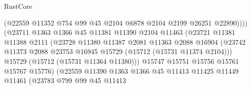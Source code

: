 \begin{lexlean}{RustCore}
\begin{coremodule}
                                      (@22559
                                        @11352
                                        @754
                                        @99
                                        @45
                                        @2104
                                        @6878
                                        @2104
                                        @2199
                                        @26251
                                        @22890))))
                                (@23711
                                  @1363
                                  @1366
                                  @45
                                  @11381
                                  @11390
                                  @2104
                                  @11463
                                  (@23721
                                    @11381
                                    @11388
                                    @2111
                                    (@23728
                                      @11380
                                      @11387
                                      @2081
                                      @11363
                                      @2088
                                      @16904
                                      (@23742
                                        @11373
                                        @2088
                                        @23753
                                        @16945
                                        @15729
                                        (@15712 (@15731 @11374 @2104)))
                                      @15729
                                      (@15712 (@15731 @11364 @11380)))
                                    @15747
                                    @15751
                                    @15756
                                    @15761
                                    @15767
                                    @15776)
                                  (@22559
                                    @11390
                                    @1363
                                    @1366
                                    @45
                                    @11413
                                    @11425
                                    @11449
                                    @11461
                                    (@23783
                                      @799
                                      @99
                                      @45
                                      @11413

\end{coremodule}
\end{lexlean}
